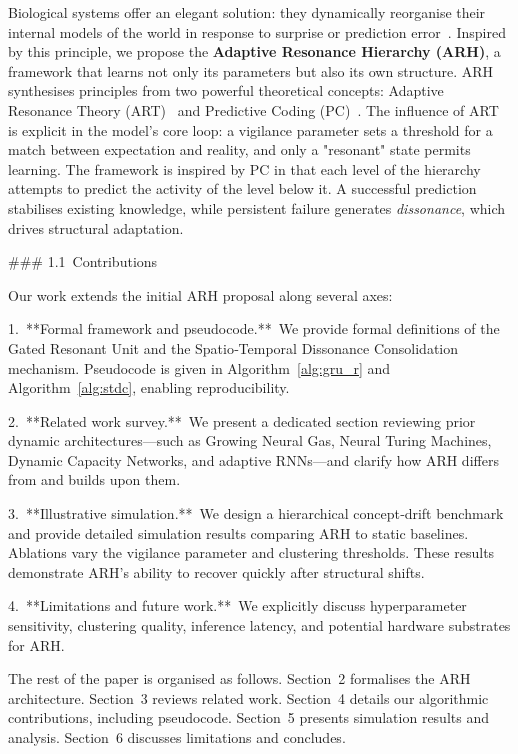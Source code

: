 \documentclass{article}
\begin{document}
Biological systems offer an elegant solution: they dynamically reorganise their internal models of the world in response to surprise or prediction error \citep{Piaget1954}.  Inspired by this principle, we propose the \textbf{Adaptive Resonance Hierarchy (ARH)}, a framework that learns not only its parameters but also its own structure.  ARH synthesises principles from two powerful theoretical concepts: Adaptive Resonance Theory (ART) \citep{Grossberg1987} and Predictive Coding (PC) \citep{Rao1999}.  The influence of ART is explicit in the model's core loop: a vigilance parameter sets a threshold for a match between expectation and reality, and only a "resonant" state permits learning.  The framework is inspired by PC in that each level of the hierarchy attempts to predict the activity of the level below it.  A successful prediction stabilises existing knowledge, while persistent failure generates \emph{dissonance}, which drives structural adaptation.

### 1.1 Contributions

Our work extends the initial ARH proposal along several axes:

1. **Formal framework and pseudocode.** We provide formal definitions of the Gated Resonant Unit and the Spatio‑Temporal Dissonance Consolidation mechanism.  Pseudocode is given in Algorithm \ref{alg:gru_r} and Algorithm \ref{alg:stdc}, enabling reproducibility.

2. **Related work survey.** We present a dedicated section reviewing prior dynamic architectures—such as Growing Neural Gas, Neural Turing Machines, Dynamic Capacity Networks, and adaptive RNNs—and clarify how ARH differs from and builds upon them.

3. **Illustrative simulation.** We design a hierarchical concept‑drift benchmark and provide detailed simulation results comparing ARH to static baselines.  Ablations vary the vigilance parameter and clustering thresholds.  These results demonstrate ARH’s ability to recover quickly after structural shifts.

4. **Limitations and future work.** We explicitly discuss hyperparameter sensitivity, clustering quality, inference latency, and potential hardware substrates for ARH.

The rest of the paper is organised as follows.  Section 2 formalises the ARH architecture.  Section 3 reviews related work.  Section 4 details our algorithmic contributions, including pseudocode.  Section 5 presents simulation results and analysis.  Section 6 discusses limitations and concludes.
\end{document}

